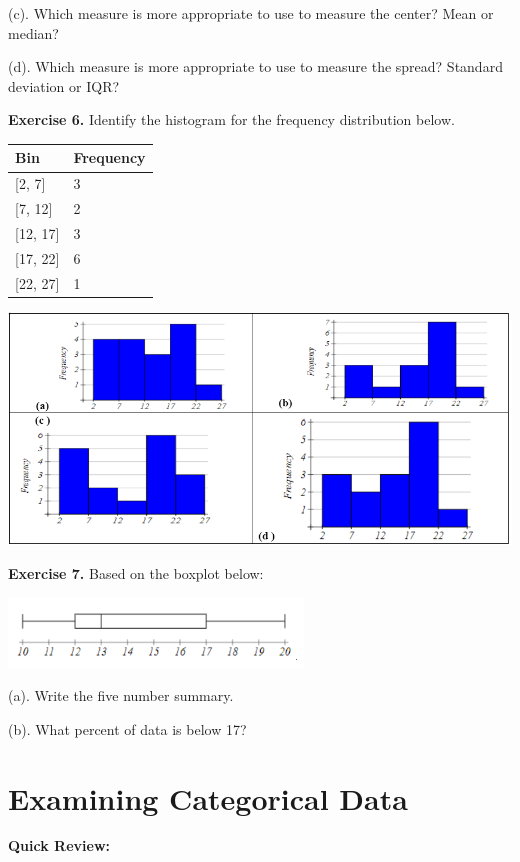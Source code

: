 \documentclass[
]{book}
\begin{document}
(c). Which measure is more appropriate to use to measure the center? Mean or median?

(d). Which measure is more appropriate to use to measure the spread? Standard deviation or IQR?

\textbf{Exercise 6.} Identify the histogram for the frequency distribution below.

\begin{longtable}[]{@{}ll@{}}
\toprule\noalign{}
Bin & Frequency \\
\midrule\noalign{}
\endhead
\bottomrule\noalign{}
\endlastfoot
{[}2, 7{]} & 3 \\
{[}7, 12{]} & 2 \\
{[}12, 17{]} & 3 \\
{[}17, 22{]} & 6 \\
{[}22, 27{]} & 1 \\
\end{longtable}

\includegraphics[width=5.63542in,height=\textheight]{images/img26.png}

\textbf{Exercise 7.} Based on the boxplot below:

\includegraphics[width=3.08333in,height=\textheight]{images/img27.png}

(a). Write the five number summary.

(b). What percent of data is below 17?

\section{Examining Categorical Data}\label{examining-categorical-data}

\textbf{Quick Review:}
\end{document}
